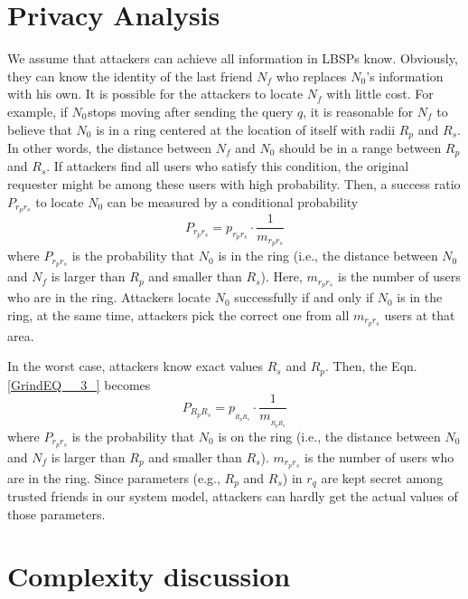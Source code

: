 \section{ Privacy Analysis}

\noindent We assume that attackers can achieve all information in LBSPs know. Obviously, they can know the identity of the last friend $N_f$ who replaces ${N}_{0}$'s information with his own. It is possible for the attackers to locate $N_f$ with little cost. For example, if ${N}_{0}$${}_{ }$stops moving after sending the query $q$, it is reasonable for $N_f$ to believe that ${N}_{0}$ is in a ring centered at the location of itself with radii ${R}_{p}$ and ${R}_{s}$. In other words, the distance between ${N}_{f}$ and ${N}_{0}$ should be in a range between ${R}_{p}$ and ${R}_{s}$. If attackers find all users who satisfy this condition, the original requester might be among these users with high probability. Then, a success ratio $P_{r_pr_s}$ to locate ${N}_{0}$ can be measured by a conditional probability
\begin{equation} \label{GrindEQ__3_} 
P_{r_{p} r_{s} } =p_{r_{p} r_{s} } \cdot \frac{1}{m_{r_{p} r_{s} } }  
\end{equation} 
where $P_{r_pr_s}$ is the probability that ${N}_{0}$ is in the ring (i.e., the distance between ${N}_{0}$ and ${N}_{f}$ is larger than ${R}_{p}$ and smaller than ${R}_{s}$). Here, $m_{r_pr_s}$ is the number of users who are in the ring. Attackers locate ${N}_{0}$ successfully if and only if ${N}_{0}$ is in the ring, at the same time, attackers pick the correct one from all $m_{r_pr_s}$ users at that area.

\noindent In the worst case, attackers know exact values $R_s$ and $R_p$. Then, the Eqn. \eqref{GrindEQ__3_} becomes 
\begin{equation} \label{GrindEQ__4_} 
P_{R_{p} R_{s} } =p_{_{R_{p} R_{s} } } \cdot \frac{1}{m_{_{R_{p} R_{s} } } }  
\end{equation} 
where $P_{r_pr_s}$ is the probability that ${N}_{0}$ is on the ring (i.e., the distance between ${N}_{0}$ and ${N}_{f}$ is larger than ${R}_{p}$ and smaller than ${R}_{s}$). $m_{r_pr_s}$ is the number of users who are in the ring. Since parameters (e.g., ${R}_{p}$ and ${R}_{s}$) in ${r}_{q}$ are kept secret among trusted friends in our system model, attackers can hardly get the actual values of those parameters.

\section{ Complexity discussion}


